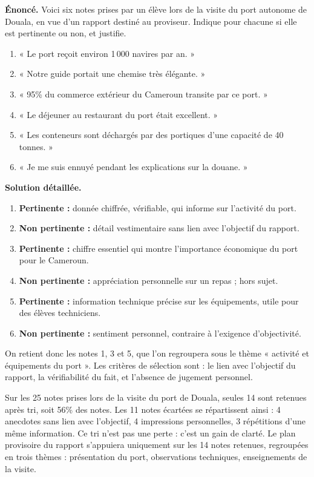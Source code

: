 \documentclass[11pt]{article}
\begin{document}
\begin{exoresolu}
\textbf{Énoncé.} Voici six notes prises par un élève lors de la visite du port autonome de Douala, en vue d'un rapport destiné au proviseur. Indique pour chacune si elle est pertinente ou non, et justifie.
\begin{enumerate}
\item « Le port reçoit environ 1\,000 navires par an. »
\item « Notre guide portait une chemise très élégante. »
\item « 95\% du commerce extérieur du Cameroun transite par ce port. »
\item « Le déjeuner au restaurant du port était excellent. »
\item « Les conteneurs sont déchargés par des portiques d'une capacité de 40 tonnes. »
\item « Je me suis ennuyé pendant les explications sur la douane. »
\end{enumerate}
\tcblower
\textbf{Solution détaillée.}
\begin{enumerate}
\item \textbf{Pertinente :} donnée chiffrée, vérifiable, qui informe sur l'activité du port.
\item \textbf{Non pertinente :} détail vestimentaire sans lien avec l'objectif du rapport.
\item \textbf{Pertinente :} chiffre essentiel qui montre l'importance économique du port pour le Cameroun.
\item \textbf{Non pertinente :} appréciation personnelle sur un repas ; hors sujet.
\item \textbf{Pertinente :} information technique précise sur les équipements, utile pour des élèves techniciens.
\item \textbf{Non pertinente :} sentiment personnel, contraire à l'exigence d'objectivité.
\end{enumerate}
On retient donc les notes 1, 3 et 5, que l'on regroupera sous le thème « activité et équipements du port ». Les critères de sélection sont : le lien avec l'objectif du rapport, la vérifiabilité du fait, et l'absence de jugement personnel.
\end{exoresolu}

\begin{exemplebox}
Sur les 25 notes prises lors de la visite du port de Douala, seules 14 sont retenues après tri, soit 56\% des notes. Les 11 notes écartées se répartissent ainsi : 4 anecdotes sans lien avec l'objectif, 4 impressions personnelles, 3 répétitions d'une même information. Ce tri n'est pas une perte : c'est un gain de clarté. Le plan provisoire du rapport s'appuiera uniquement sur les 14 notes retenues, regroupées en trois thèmes : présentation du port, observations techniques, enseignements de la visite.
\end{exemplebox}
\end{document}
